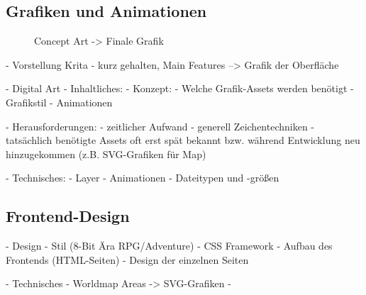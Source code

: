 

\subsection{Grafiken und Animationen}

\begin{figure}[H]
    \centering
    \label{fig:mine_exterior_concept}
    \caption{Concept Art -> Finale Grafik}
\end{figure}

- Vorstellung Krita
    - kurz gehalten, Main Features --> Grafik der Oberfläche

- Digital Art
    - Inhaltliches:
        - Konzept:
            - Welche Grafik-Assets werden benötigt
            - Grafikstil
            - Animationen
        
        - Herausforderungen: 
            - zeitlicher Aufwand 
            - generell Zeichentechniken
            - tatsächlich benötigte Assets oft erst spät bekannt bzw. während Entwicklung neu hinzugekommen (z.B. SVG-Grafiken für Map)
    
    - Technisches:
        - Layer
        - Animationen
        - Dateitypen und -größen


\subsection{Frontend-Design}
    - Design
        - Stil (8-Bit Ära RPG/Adventure)
        - CSS Framework
        - Aufbau des Frontends (HTML-Seiten)
        - Design der einzelnen Seiten 

    - Technisches
        - Worldmap Areas -> SVG-Grafiken
        - 